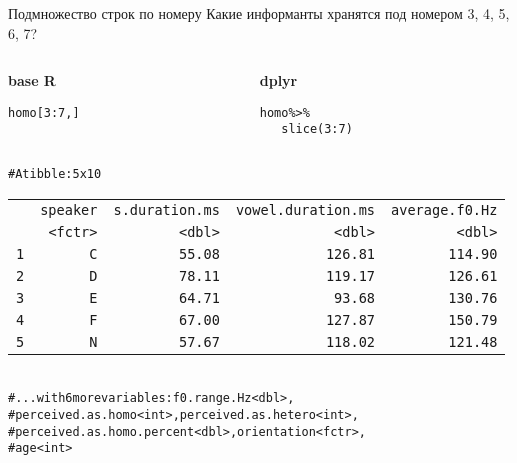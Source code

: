 \begin{frame}{Подмножество строк по номеру}
\noindent Какие информанты хранятся под номером 3, 4, 5, 6, 7?\\ \vfill
\begin{columns}[T] 
\begin{column}{.48\textwidth}
\textbf{base R}\\
\scriptsize
\begin{alltt}
homo[3:7, ]
\end{alltt}
\normalsize
\end{column}
\hfill
\begin{column}{.48\textwidth}
\textbf{dplyr}\\
\scriptsize
\begin{alltt}
homo \alert{\%>\%}\\ 
\ \ \ \alert{slice(}3:7\alert{)}
\end{alltt}
\normalsize
\end{column}
\end{columns}
\hfill
\scriptsize
\begin{alltt}
\# A tibble: 5 x 10\\
\begin{tabular}{rrrrr}
 & speaker & s.duration.ms & vowel.duration.ms & average.f0.Hz \\ 
 & <fctr> & <dbl> & <dbl> & <dbl> \\ 
1 & C & 55.08 & 126.81 & 114.90 \\ 
2 & D & 78.11 & 119.17 & 126.61 \\ 
3 & E & 64.71 & 93.68 & 130.76  \\ 
4 & F & 67.00 & 127.87 & 150.79 \\ 
5 & N & 57.67 & 118.02 & 121.48 \\ 
\end{tabular}
\\
\# ... with 6 more variables: f0.range.Hz <dbl>,\\
\#   perceived.as.homo <int>, perceived.as.hetero <int>,\\
\#   perceived.as.homo.percent <dbl>, orientation <fctr>,\\
\#   age <int>
\end{alltt}
\normalsize
\hfill\\
\end{frame}

